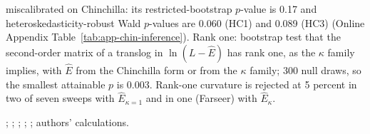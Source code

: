 \begin{table}[tp]
\begin{tablenotes}
miscalibrated on Chinchilla: its restricted-bootstrap $p$-value is 0.17 and heteroskedasticity-robust Wald $p$-values are
0.060 (HC1) and 0.089 (HC3) (Online Appendix Table~\ref{tab:app-chin-inference}). Rank one: bootstrap test that the
second-order matrix of a translog in $\ln(L-\hat E)$ has rank one, as the $\kappa$ family implies, with $\hat E$ from the
Chinchilla form or from the $\kappa$ family; 300 null draws, so the smallest attainable $p$ is 0.003. Rank-one curvature is rejected at 5 percent in two
of seven sweeps with $\hat E_{\kappa=1}$ and in one (Farseer) with $\hat E_\kappa$.
\end{tablenotes}
\begin{tablenotes}[Source]
\citet{hoffmann2022training}; \citet{li2025predictableb}; \citet{gadre2024language}; \citet{bhagia2024establishing};
\citet{muennighoff2023scaling}; authors' calculations.
\end{tablenotes}
\end{table}
